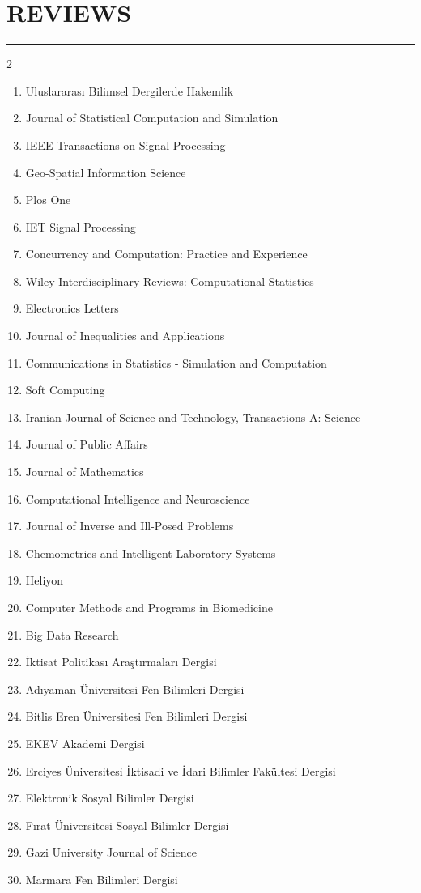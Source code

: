 \documentclass[10pt,letterpaper]{article}
\newcommand{\NewPart}[2]{%
	\Needspace{7\baselineskip}%
	\vspace{0.45em}%
	\section*{\sffamily\large\bfseries\color{MidnightBlue}\uppercase{#1} #2}%
	\vspace{-0.7em}\noindent\color{MidnightBlue}\rule{\textwidth}{0.55pt}\color{Black}\vspace{0.25em}}
\begin{document}
\NewPart{Reviews}{}
\begin{multicols}{2}
\begin{enumerate}
\item Uluslararası Bilimsel Dergilerde Hakemlik
\item Journal of Statistical Computation and Simulation 
\item IEEE Transactions on Signal Processing 
\item Geo-Spatial Information Science 
\item Plos One 
\item IET Signal Processing 
\item Concurrency and Computation: Practice and Experience 
\item Wiley Interdisciplinary Reviews: Computational Statistics 
\item Electronics Letters 
\item Journal of Inequalities and Applications 
\item Communications in Statistics - Simulation and Computation 
\item Soft Computing 
\item Iranian Journal of Science and Technology, Transactions A: Science 
\item Journal of Public Affairs 
\item Journal of Mathematics
\item Computational Intelligence and Neuroscience
\item Journal of Inverse and Ill-Posed Problems 
\item Chemometrics and Intelligent Laboratory Systems
\item Heliyon
\item Computer Methods and Programs in Biomedicine
\item Big Data Research
\item İktisat Politikası Araştırmaları Dergisi
\item Adıyaman Üniversitesi Fen Bilimleri Dergisi
\item Bitlis Eren Üniversitesi Fen Bilimleri Dergisi
\item EKEV Akademi Dergisi
\item Erciyes Üniversitesi İktisadi ve İdari Bilimler Fakültesi Dergisi
\item Elektronik Sosyal Bilimler Dergisi
\item Fırat Üniversitesi Sosyal Bilimler Dergisi
\item Gazi University Journal of Science
\item Marmara Fen Bilimleri Dergisi

\end{enumerate}
\end{multicols}
\end{document}
